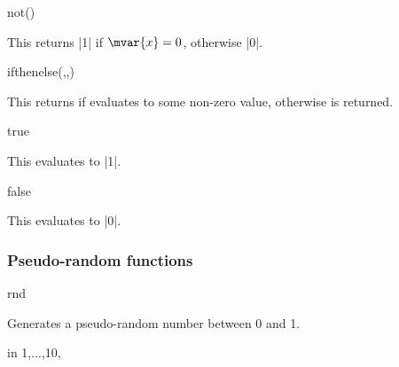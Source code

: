\begin{math-function}{not()}
\mathcommand

	This returns |1| if $\mvar{x}=0$, otherwise |0|.
	
\begin{codeexample}[]
 \pgfmathresult
\end{codeexample}

\end{math-function}


\begin{math-function}{ifthenelse(,,)}
\mathcommand

	This returns  if  evaluates to some non-zero value,
	otherwise  is returned.
	
\begin{codeexample}[]
 \pgfmathresult
\end{codeexample}

\end{math-function}

\begin{math-function}{true}
\mathcommand

	This evaluates to |1|.
	
\begin{codeexample}[]
 \pgfmathresult
\end{codeexample}

\end{math-function}

\begin{math-function}{false}
\mathcommand

	This evaluates to |0|.
	
\begin{codeexample}[]
 \pgfmathresult
\end{codeexample}

\end{math-function}



\subsubsection{Pseudo-random functions}

\label{pgfmath-functions-random}

\begin{math-function}{rnd}
\mathcommand

	Generates a pseudo-random number between 0 and 1.

\begin{codeexample}[]
\foreach \x in {1,...,10}{\pgfmathresult, }
\end{codeexample}

\end{math-function}

